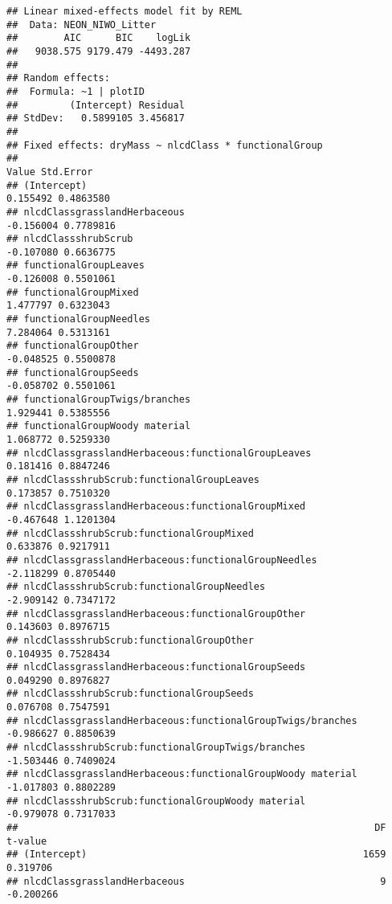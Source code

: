 \documentclass[]{article}
\begin{document}
\begin{verbatim}
## Linear mixed-effects model fit by REML
##  Data: NEON_NIWO_Litter 
##        AIC      BIC    logLik
##   9038.575 9179.479 -4493.287
## 
## Random effects:
##  Formula: ~1 | plotID
##         (Intercept) Residual
## StdDev:   0.5899105 3.456817
## 
## Fixed effects: dryMass ~ nlcdClass * functionalGroup 
##                                                                Value Std.Error
## (Intercept)                                                 0.155492 0.4863580
## nlcdClassgrasslandHerbaceous                               -0.156004 0.7789816
## nlcdClassshrubScrub                                        -0.107080 0.6636775
## functionalGroupLeaves                                      -0.126008 0.5501061
## functionalGroupMixed                                        1.477797 0.6323043
## functionalGroupNeedles                                      7.284064 0.5313161
## functionalGroupOther                                       -0.048525 0.5500878
## functionalGroupSeeds                                       -0.058702 0.5501061
## functionalGroupTwigs/branches                               1.929441 0.5385556
## functionalGroupWoody material                               1.068772 0.5259330
## nlcdClassgrasslandHerbaceous:functionalGroupLeaves          0.181416 0.8847246
## nlcdClassshrubScrub:functionalGroupLeaves                   0.173857 0.7510320
## nlcdClassgrasslandHerbaceous:functionalGroupMixed          -0.467648 1.1201304
## nlcdClassshrubScrub:functionalGroupMixed                    0.633876 0.9217911
## nlcdClassgrasslandHerbaceous:functionalGroupNeedles        -2.118299 0.8705440
## nlcdClassshrubScrub:functionalGroupNeedles                 -2.909142 0.7347172
## nlcdClassgrasslandHerbaceous:functionalGroupOther           0.143603 0.8976715
## nlcdClassshrubScrub:functionalGroupOther                    0.104935 0.7528434
## nlcdClassgrasslandHerbaceous:functionalGroupSeeds           0.049290 0.8976827
## nlcdClassshrubScrub:functionalGroupSeeds                    0.076708 0.7547591
## nlcdClassgrasslandHerbaceous:functionalGroupTwigs/branches -0.986627 0.8850639
## nlcdClassshrubScrub:functionalGroupTwigs/branches          -1.503446 0.7409024
## nlcdClassgrasslandHerbaceous:functionalGroupWoody material -1.017803 0.8802289
## nlcdClassshrubScrub:functionalGroupWoody material          -0.979078 0.7317033
##                                                              DF   t-value
## (Intercept)                                                1659  0.319706
## nlcdClassgrasslandHerbaceous                                  9 -0.200266

\end{verbatim}
\end{document}
